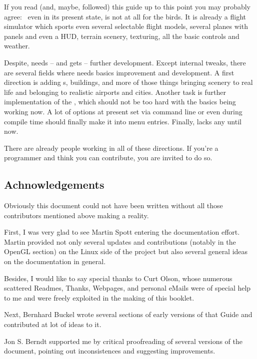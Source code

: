 If you read (and, maybe, followed) this guide up to this point you may probably agree: \FlightGear{}\, even in its present state, is not at all for the birds. It is
already a flight simulator which sports even several selectable flight models, several planes with panels and even a HUD, terrain scenery, texturing, all the basic controls and weather.

Despite, \FlightGear{} needs -- and gets -- further development. Except internal tweaks,
there are several fields where \FlightGear{} needs basics improvement and development. A
first direction is adding s, buildings, and more of those things bringing
scenery to real life and belonging to realistic airports and cities. Another task is further
implementation of the , which should not be too hard with the basics
being working now. A lot of options at present set via command line or even during
compile time should finally make it into menu entries. Finally, \FlightGear{} lacks any
 until now.

There are already people working in all of these directions. If you're a programmer and
think you can contribute, you are invited to do so.

\subsection*{Achnowledgements}
Obviously this document could not have been written without all those contributors
mentioned above making \FlightGear{} a reality.

First, I was very glad to see Martin Spott  entering
the documentation effort. Martin provided not only several updates and
contributions (notably in the OpenGL section) on the Linux side of the
project but also several general ideas on the documentation in general.

Besides, I would like to say special thanks to Curt Olson, whose
numerous scattered Readmes, Thanks, Webpages, and personal eMails were of special help to
me and were freely exploited in the making of this booklet.

Next, Bernhard Buckel  wrote several sections of early versions
of that Guide and contributed at lot of ideas to it.

Jon S. Berndt  supported me by critical proofreading of several
versions of the document, pointing out inconsistences and suggesting improvements.

